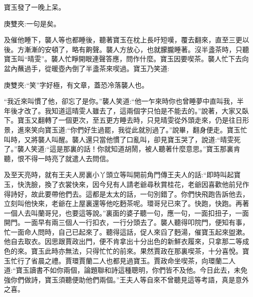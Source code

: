 \begin{parag}
    寶玉發了一晚上呆。\begin{note}庚雙夾:一句是矣。\end{note}及催他睡下，襲人等也都睡後，聽著寶玉在枕上長吁短嘆，覆去翻來，直至三更以後。方漸漸的安頓了，略有齁聲。襲人方放心，也就朦朧睡著。沒半盞茶時，只聽寶玉叫“晴雯”。襲人忙睜開眼連聲答應，問作什麼。寶玉因要喫茶。襲人忙下去向盆內蘸過手，從暖壺內倒了半盞茶來喫過。寶玉乃笑道:\begin{note}庚雙夾:“笑”字好極，有文章，蓋恐冷落襲人也。\end{note}“我近來叫慣了他，卻忘了是你。”襲人笑道:“他一乍來時你也曾睡夢中直叫我，半年後才改了。我知道這晴雯人雖去了，這兩個字只怕是不能去的。”說著，大家又臥下。寶玉又翻轉了一個更次，至五更方睡去時，只見晴雯從外頭走來，仍是往日形景，進來笑向寶玉道:“你們好生過罷，我從此就別過了。”說畢，翻身便走。寶玉忙叫時，又將襲人叫醒。襲人還只當他慣了口亂叫，卻見寶玉哭了，說道:“晴雯死了。”襲人笑道:“這是那裏的話！你就知道胡鬧，被人聽著什麼意思。”寶玉那裏肯聽，恨不得一時亮了就遣人去問信。
\end{parag}


\begin{parag}
    及至天亮時，就有王夫人房裏小丫頭立等叫開前角門傳王夫人的話:“即時叫起寶玉，快洗臉，換了衣裳快來，因今兒有人請老爺尋秋賞桂花，老爺因喜歡他前兒作得詩好，故此要帶他們去。這都是太太的話，一句別錯了。你們快飛跑告訴他去，立刻叫他快來，老爺在上屋裏還等他吃麪茶呢。環哥兒已來了。快跑，快跑。再著一個人去叫蘭哥兒，也要這等說。”裏面的婆子聽一句，應一句，一面扣扭子，一面開門。一面早有兩三個人一行扣衣，一行分頭去了。襲人聽得叩院門，便知有事，忙一面命人問時，自己已起來了。聽得這話，促人來舀了麪湯，催寶玉起來盥漱。他自去取衣。因思跟賈政出門，便不肯拿出十分出色的新鮮衣履來，只拿那二等成色的來。寶玉此時亦無法，只得忙忙的前來。果然賈政在那裏喫茶，十分喜悅。寶玉忙行了省晨之禮。賈環賈蘭二人也都見過寶玉。賈政命坐喫茶，向環蘭二人道:“寶玉讀書不如你兩個，論題聯和詩這種聰明，你們皆不及他。今日此去，未免強你們做詩，寶玉須聽便助他們兩個。”王夫人等自來不曾聽見這等考語，真是意外之喜。
\end{parag}



